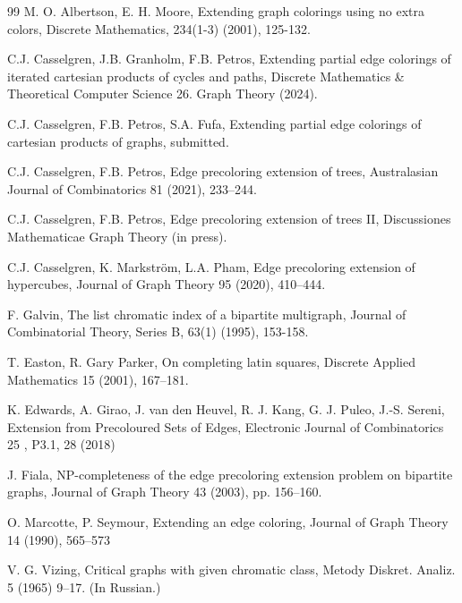 \documentclass[a4paper,12pt]{article}
\begin{document}
\begin{thebibliography}{99}
 M. O. Albertson, E. H. Moore, Extending graph colorings using no extra colors, Discrete Mathematics, 234(1-3)  (2001), 125-132.

 C.J. Casselgren, J.B. Granholm, F.B. Petros, Extending partial edge colorings of iterated cartesian products of cycles and paths, Discrete Mathematics \& Theoretical Computer Science 26. Graph Theory (2024).

 C.J. Casselgren, F.B. Petros, S.A. Fufa, Extending partial edge colorings of cartesian products of graphs, submitted.

C.J. Casselgren, F.B. Petros, Edge precoloring extension of trees, Australasian Journal of Combinatorics 81 (2021), 233–244.

 C.J. Casselgren, F.B. Petros, Edge precoloring extension of trees II, Discussiones Mathematicae Graph Theory (in press).

 C.J. Casselgren, K. Markström, L.A. Pham, Edge precoloring extension of hypercubes, Journal of Graph Theory 95 (2020), 410–444.

 F. Galvin, The list chromatic index of a bipartite multigraph, Journal of Combinatorial Theory, Series B, 63(1) (1995), 153-158.

 T. Easton, R. Gary Parker, On completing latin squares, Discrete Applied Mathematics 15 (2001), 167–181.

 K. Edwards, A. Girao, J. van den Heuvel, R. J. Kang, G. J. Puleo, J.-S. Sereni, Extension from Precoloured Sets of Edges, Electronic Journal of Combinatorics 25 , P3.1, 28 (2018)

 J. Fiala, NP-completeness of the edge precoloring extension problem on bipartite graphs, Journal of Graph Theory 43 (2003), pp. 156–160.

 O. Marcotte, P. Seymour, Extending an edge coloring, Journal of Graph Theory 14 (1990), 565–573

 V. G. Vizing, Critical graphs with given chromatic class, Metody Diskret. Analiz. 5 (1965) 9–17. (In Russian.)
\end{thebibliography}
\end{document}
